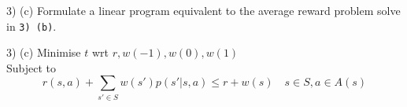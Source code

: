 \documentclass[11pt,a4paper]{article}
\begin{document}
\begin{question}{3) (c)}
  Formulate a linear program equivalent to the average reward problem solve in \texttt{3) (b)}.
\end{question}

\begin{answer}{3) (c)}
  Minimise $t$ wrt $r,w(-1),w(0),w(1)$\\
  Subject to
  \[ r(s,a)+\sum_{s'\in S}w(s')p(s'|s,a)\leq r+w(s)\quad s\in S,a\in A(s) \]
\end{answer}
\end{document}

